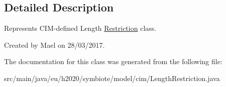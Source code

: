 \subsection{Detailed Description}
Represents C\+I\+M-\/defined Length \hyperlink{classeu_1_1h2020_1_1symbiote_1_1model_1_1cim_1_1Restriction}{Restriction} class.

Created by Mael on 28/03/2017. 

The documentation for this class was generated from the following file\+:\begin{DoxyCompactItemize}
\item 
src/main/java/eu/h2020/symbiote/model/cim/Length\+Restriction.\+java\end{DoxyCompactItemize}
